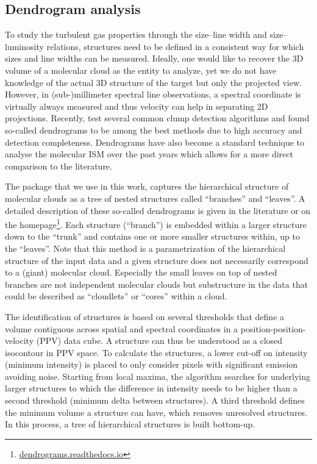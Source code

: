 
\subsection{Dendrogram analysis}
\label{dendro: section: dendrogram}

To study the turbulent gas properties through the size--line width and size--luminosity relations, structures need to be defined in a consistent way for which sizes and line widths can be measured. Ideally, one would like to recover the 3D volume of a molecular cloud as the entity to analyze, yet we do not have knowledge of the actual 3D structure of the target but only the projected view. However, in (sub-)millimeter spectral line observations, a spectral coordinate is virtually always measured and thus velocity can help in separating 2D projections. 
Recently, \citet{2019arXiv191007692L} test several common clump detection algorithms and found so-called dendrograms to be among the best methods due to high accuracy and detection completeness. Dendrograms have also become a standard technique to analyse the molecular ISM over the past years which allows for a more direct comparison to the literature.

The \astrodendro package that we use in this work, captures the hierarchical structure of molecular clouds as a tree of nested structures called ``branches'' and ``leaves''. A detailed description of these so-called dendrograms is given in the literature \citep[e.g.][]{2008ApJ...679.1338R,Goodman:2009dp,2012MNRAS.425..720S} or on the \astrodendro homepage\footnote{\url{dendrograms.readthedocs.io}}. Each structure (``branch'') is embedded within a larger structure down to the ``trunk'' and contains one or more smaller structures within, up to the ``leaves''.
Note that this method is a parametrization of the hierarchical structure of the input data and a given structure does not necessarily correspond to a (giant) molecular cloud. Especially the small leaves on top of nested branches are not independent molecular clouds but substructure in the data that could be described as ``cloudlets'' or ``cores'' within a cloud.

The identification of structures is based on several thresholds that define a volume contiguous across spatial and spectral coordinates in a position-position-velocity (PPV) data cube. A structure can thus be understood as a closed isocontour in PPV space. 
To calculate the structures, a lower cut-off on intensity (minimum intensity) is placed to only consider pixels with significant emission avoiding noise. 
Starting from local maxima, the algorithm searches for underlying larger structures to which the difference in intensity needs to be higher than a second threshold (minimum delta between structures).
A third threshold defines the minimum volume a structure can have, which removes unresolved structures. In this process, a tree of hierarchical structures is built bottom-up.


